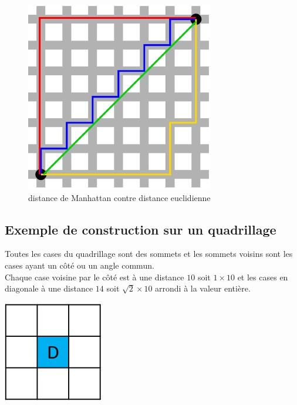 \begin{figure}[!h]
\centering
\includegraphics[scale=0.7]{images/manhattan.jpg}
\caption{distance de Manhattan contre distance euclidienne}
\end{figure}

\subsection{Exemple de construction sur un quadrillage}

\begin{minipage}[c]{.6\linewidth}
Toutes les cases du quadrillage sont des sommets et les sommets voisins sont les cases ayant un côté ou un angle commun.\\
Chaque case voisine par le côté est à une distance $10$ soit $1 \times 10$ et les cases en diagonale à une distance $14$ soit $\sqrt{2} \times 10$ arrondi à la valeur entière.\\
\end{minipage}
\hfill %
\begin{minipage}[c]{.35\linewidth}
\begin{center}
\includegraphics[scale=0.7]{images/quadri1.jpg}
\end{center}
\end{minipage}


